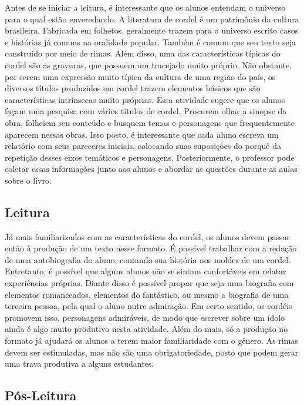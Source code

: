 \documentclass[12pt]{extarticle}
\begin{document}
Antes de se iniciar a leitura, é interessante que os alunos
entendam o universo para o qual estão enveredando. A literatura de
cordel é um patrimônio da cultura brasileira. Fabricada em folhetos,
geralmente trazem para o universo escrito casos e histórias já comuns na
oralidade popular. Também é comum que seu texto seja construído por meio
de rimas. Além disso, uma das características típicas do cordel são as
gravuras, que possuem um tracejado muito próprio. Não obstante, por
serem uma expressão muito típica da cultura de uma região do país, os
diversos títulos produzidos em cordel trazem elementos básicos que são
características intrínsecas muito próprias. Essa atividade sugere que os
alunos façam uma pesquisa com vários títulos de cordel. Procurem olhar a
sinopse da obra, folheiem seu conteúdo e busquem temas e personagens que
frequentemente aparecem nessas obras. Isso posto, é interessante que
cada aluno escreva um relatório com seus pareceres iniciais, colocando
suas suposições do porquê da repetição desses eixos temáticos e
personagens. Posteriormente, o professor pode coletar essas informações
junto aos alunos e abordar as questões durante as aulas sobre o livro.

\subsection{Leitura}



Já mais familiarizados com as características do cordel, os
alunos devem passar então à produção de um texto nesse formato. É
possível trabalhar com a redação de uma autobiografia do aluno, contando
sua história nos moldes de um cordel. Entretanto, é possível que alguns
alunos não se sintam confortáveis em relatar experiências próprias.
Diante disso é possível propor que seja uma biografia com elementos
romanceados, elementos do fantástico, ou mesmo a biografia de uma
terceira pessoa, pela qual o aluno nutre admiração. Em certo sentido, os
cordéis promovem isso, personagens admiráveis, de modo que escrever
sobre um ídolo ainda é algo muito produtivo nesta atividade. Além do
mais, só a produção no formato já ajudará os alunos a terem maior
familiaridade com o gênero. As rimas devem ser estimuladas, mas não são
uma obrigatoriedade, posto que podem gerar uma trava produtiva a alguns
estudantes.


\subsection{Pós-Leitura}
\end{document}
